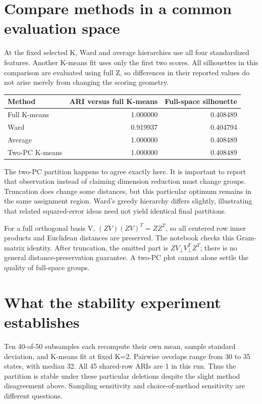 \section{Compare methods in a common evaluation space}
At the fixed selected K, Ward and average hierarchies use all four standardized features.
Another K-means fit uses only the first two scores. All silhouettes in this comparison are evaluated using full Z,
so differences in their reported values do not arise merely from changing the scoring geometry.
\begin{center}\begin{tabular}{lrr}\toprule
Method&ARI versus full K-means&Full-space silhouette\\\midrule
Full K-means&1.000000&0.408489\\Ward&0.919937&0.404794\\
Average&1.000000&0.408489\\Two-PC K-means&1.000000&0.408489\\\bottomrule\end{tabular}\end{center}
The two-PC partition happens to agree exactly here. It is important to report that observation instead of claiming dimension reduction
must change groups. Truncation does change some distances, but this particular optimum remains in the same assignment region.
Ward's greedy hierarchy differs slightly, illustrating that related squared-error ideas need not yield identical final partitions.

For a full orthogonal basis V, $(ZV)(ZV)^T=ZZ^T$, so all centered row inner products and Euclidean distances are preserved.
The notebook checks this Gram-matrix identity. After truncation, the omitted part is $ZV_\perp V_\perp^TZ^T$;
there is no general distance-preservation guarantee. A two-PC plot cannot alone settle the quality of full-space groups.


\section{What the stability experiment establishes}
Ten 40-of-50 subsamples each recompute their own mean, sample standard deviation, and K-means fit at fixed K=2.
Pairwise overlaps range from 30 to 35 states, with median 32. All 45 shared-row ARIs are 1 in this run.
Thus the partition is stable under these particular deletions despite the slight method disagreement above.
Sampling sensitivity and choice-of-method sensitivity are different questions.

